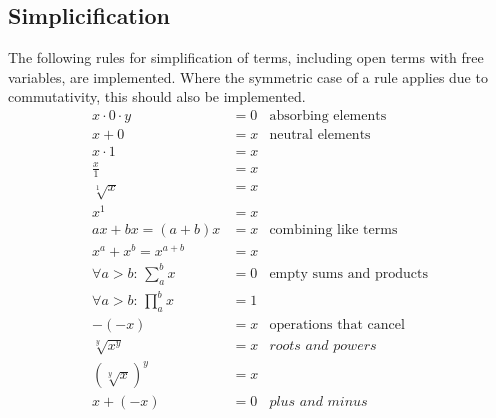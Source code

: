 \documentclass[oneside, a4paper]{article}
\begin{document}
\subsection*{Simplicification}
The following rules for simplification of terms, including open terms with free variables, are implemented. Where the symmetric case of a rule applies due to commutativity, this should also be implemented.
\begin{align*}
    x \cdot 0 \cdot y              & = 0                                  & \text{absorbing elements}            \\
    x + 0                          & = x                                  & \text{neutral elements}              \\
    x \cdot 1                      & = x                                  &                                      \\
    \frac{x}{1}                    & = x                                  &                                      \\
    \sqrt[1]{x}                    & = x                                  &                                      \\
    x^1                            & = x                                  &                                      \\
    ax + bx = (a+b)x               & = x                                  & \text{combining like terms}          \\
    x^a + x^b = x^{a+b}            & = x                                  &                                      \\
    \forall a>b:\, \sum_{a}^{b} x  & = 0                                  & \text{empty sums and products}       \\
    \forall a>b:\, \prod_{a}^{b} x & = 1                                  &                                      \\
    -(-x)                          & = x                                  & \text{operations that cancel}        \\
    \sqrt[y]{x^y}                  & = x                                  & \textit{roots and powers}            \\
    \left(\sqrt[y]{x}\right)^y     & = x                                  &                                      \\
    x + (-x)                       & = 0                                  & \textit{plus and minus}              \\

\end{align*}
\end{document}

